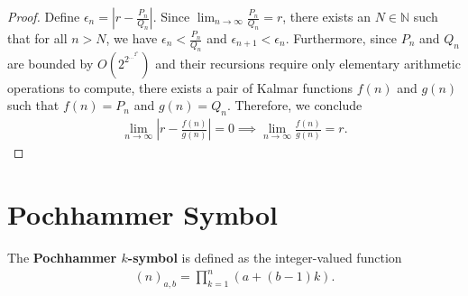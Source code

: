 \documentclass[10pt,a4paper]{article}
\theoremstyle{plain}
\begin{document}
\begin{proof}
Define $\epsilon_n = \left| r - \frac{P_n}{Q_n} \right|$. Since $\lim_{n\to\infty} \frac{P_n}{Q_n} = r$, there exists an $N \in \mathbb{N}$ such that for all $n > N$, we have $\epsilon_n < \frac{P_n}{Q_n}$ and $\epsilon_{n+1} < \epsilon_n$. Furthermore, since $P_n$ and $Q_n$ are bounded by $O(2^{2^{\ldots^{2^n}}})$ and their recursions require only elementary arithmetic operations to compute, there exists a pair of Kalmar functions $f(n)$ and $g(n)$ such that $f(n)=P_n$ and $g(n) = Q_n$. Therefore, we conclude
\begin{align*}
\lim_{n\to\infty} \left| r - \frac{f(n)}{g(n)} \right| = 0 
\implies \lim_{n\to\infty} \frac{f(n)}{g(n)} = r .    
\end{align*}
\end{proof}

\section{Pochhammer Symbol}
The \textbf{Pochhammer $k$-symbol} is defined as the integer-valued function
\begin{align*}
(n)_{a,b} = \prod_{k=1}^n (a+(b-1)k) .
\end{align*}
\end{document}
